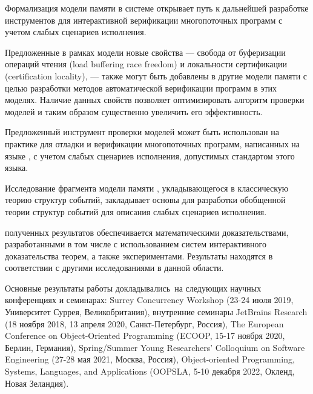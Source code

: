 {\influence}
Формализация модели памяти \Wkm в системе \coq открывает 
путь к дальнейшей разработке инструментов для  
интерактивной верификации многопоточных программ  
с учетом слабых сценариев исполнения.

Предложенные в рамках модели  \WkmS новые свойства ---
свобода от буферизации операций чтения (load buffering race freedom)
и локальности сертификации (certification locality), --- 
также могут быть добавлены в другие модели памяти 
с целью разработки методов автоматической верификации программ в этих моделях. 
Наличие данных свойств позволяет оптимизировать алгоритм 
проверки моделей и таким образом существенно увеличить его эффективность.

Предложенный инструмент проверки моделей может быть использован на практике
для отладки и верификации многопоточных программ, 
написанных на языке \CLANG, с учетом слабых сценариев исполнения, 
допустимых стандартом этого языка.

Исследование фрагмента модели памяти \Wkm, укладывающегося в
классическую теорию структур событий, закладывает основы
для разработки обобщенной теории структур событий для
описания слабых сценариев исполнения. 

{\reliability} полученных результатов обеспечивается 
математическими доказательствами, разработанными в том числе с использованием
систем интерактивного доказательства теорем, 
а также экспериментами. 
Результаты находятся в соответствии с другими исследованиями в данной области.

{\probation} Основные результаты работы докладывались~на
следующих научных конференциях и семинарах:
Surrey Concurrency Workshop (23-24 июля 2019, Университет Суррея, Великобритания), внутренние семинары JetBrains Research
(18 ноября 2018, 13 апреля 2020, Санкт-Петербург, Россия),
The European Conference on Object-Oriented Programming
(ECOOP, 15-17 ноября 2020, Берлин, Германия),
Spring/Summer Young Researchers' Colloquium on Software Engineering
(27-28 мая 2021, Москва, Россия),
Object-oriented Programming, Systems, Languages, and Applications 
(OOPSLA, 5-10 декабря 2022, Окленд, Новая Зеландия).


